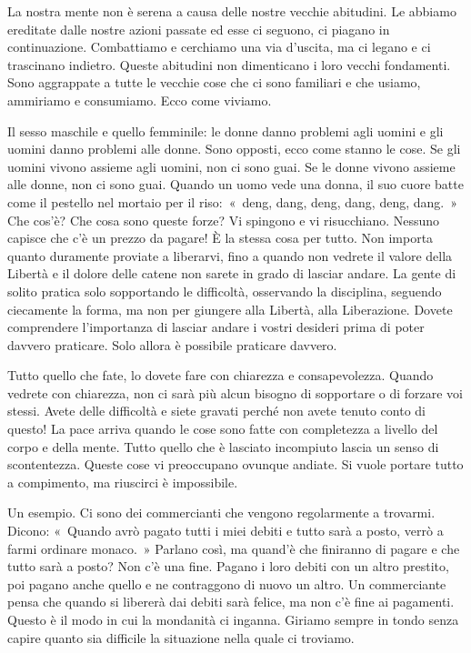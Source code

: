 La nostra mente non è serena a causa delle nostre vecchie abitudini. Le
abbiamo ereditate dalle nostre azioni passate ed esse ci seguono, ci
piagano in continuazione. Combattiamo e cerchiamo una via d'uscita, ma
ci legano e ci trascinano indietro. Queste abitudini non dimenticano i
loro vecchi fondamenti. Sono aggrappate a tutte le vecchie cose che ci
sono familiari e che usiamo, ammiriamo e consumiamo. Ecco come viviamo.

Il sesso maschile e quello femminile: le donne danno problemi agli
uomini e gli uomini danno problemi alle donne. Sono opposti, ecco come
stanno le cose. Se gli uomini vivono assieme agli uomini, non ci sono
guai. Se le donne vivono assieme alle donne, non ci sono guai. Quando un
uomo vede una donna, il suo cuore batte come il pestello nel mortaio per
il riso:~«~deng, dang, deng, dang, deng, dang.~» Che cos'è? Che cosa
sono queste forze? Vi spingono e vi risucchiano. Nessuno capisce che c'è
un prezzo da pagare! È la stessa cosa per tutto. Non importa quanto
duramente proviate a liberarvi, fino a quando non vedrete il valore
della Libertà e il dolore delle catene non sarete in grado di lasciar
andare. La gente di solito pratica solo sopportando le difficoltà,
osservando la disciplina, seguendo ciecamente la forma, ma non per
giungere alla Libertà, alla Liberazione. Dovete comprendere l'importanza
di lasciar andare i vostri desideri prima di poter davvero praticare.
Solo allora è possibile praticare davvero.

Tutto quello che fate, lo dovete fare con chiarezza e consapevolezza.
Quando vedrete con chiarezza, non ci sarà più alcun bisogno di
sopportare o di forzare voi stessi. Avete delle difficoltà e siete
gravati perché non avete tenuto conto di questo! La pace arriva quando
le cose sono fatte con completezza a livello del corpo e della mente.
Tutto quello che è lasciato incompiuto lascia un senso di scontentezza.
Queste cose vi preoccupano ovunque andiate. Si vuole portare tutto a
compimento, ma riuscirci è impossibile.

Un esempio. Ci sono dei commercianti che vengono regolarmente a
trovarmi. Dicono: «~Quando avrò pagato tutti i miei debiti e tutto sarà
a posto, verrò a farmi ordinare monaco.~» Parlano così, ma quand'è che
finiranno di pagare e che tutto sarà a posto? Non c'è una fine. Pagano i
loro debiti con un altro prestito, poi pagano anche quello e ne
contraggono di nuovo un altro. Un commerciante pensa che quando si
libererà dai debiti sarà felice, ma non c'è fine ai pagamenti. Questo è
il modo in cui la mondanità ci inganna. Giriamo sempre in tondo senza
capire quanto sia difficile la situazione nella quale ci troviamo.


